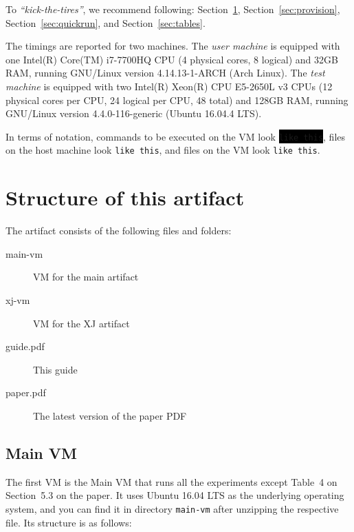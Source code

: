 \documentclass[12pt]{article}
\newcommand{\command}[1]{\colorbox{black}{\texttt{\color{white}#1}}}
\newcommand{\host}[1]{\colorbox{blue!20}{\texttt{\color{black}#1}}}
\newcommand{\vm}[1]{\colorbox{green!20}{\texttt{\color{black}#1}}}
\begin{document}
To \emph{``kick-the-tires''}, we recommend following:
Section~\ref{sec:structure}, Section~\ref{sec:provision},
Section~\ref{sec:quickrun}, and Section~\ref{sec:tables}.

The timings are reported for two machines.  The \emph{user machine} is equipped
with one Intel(R) Core(TM) i7-7700HQ CPU (4 physical cores, 8 logical) and 32GB
RAM, running GNU/Linux version 4.14.13-1-ARCH (Arch Linux).  The \emph{test
machine} is equipped with two Intel(R) Xeon(R) CPU E5-2650L v3 CPUs (12 physical
cores per CPU, 24 logical per CPU, 48 total) and 128GB RAM, running GNU/Linux
version 4.4.0-116-generic (Ubuntu 16.04.4 LTS).

In terms of notation, commands to be executed on the VM look \command{like
this}, files on the host machine look \host{like this}, and files on the VM look
\vm{like this}.

\section{Structure of this artifact}
\label{sec:structure}

The artifact consists of the following files and folders:

\begin{description}

    \item[main-vm] VM for the main artifact

    \item[xj-vm] VM for the XJ artifact

    \item[guide.pdf] This guide

    \item[paper.pdf] The latest version of the paper PDF

\end{description}


\subsection{Main VM}
\label{sec:main}

The first VM is the Main VM that runs all the experiments except Table~4 on
Section~5.3 on the paper.  It uses Ubuntu 16.04 LTS as the underlying operating
system, and you can find it in directory \host{main-vm} after unzipping the
respective file.  Its structure is as follows:
\end{document}
